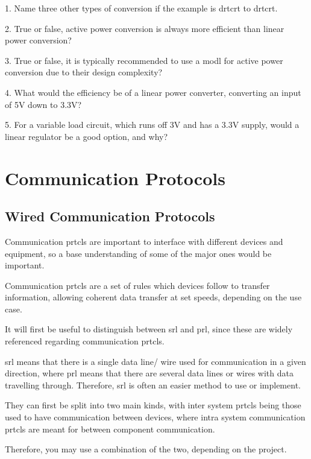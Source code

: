 \documentclass[a4paper,11pt]{report}
\newcommand{\Quiz}[1] %
{
\par\noindent %
\phantomsection %
\todo[inline, color=blue!30]{\textbf{#1}} %
\vspace{1em} %
}
\begin{document}
\Quiz{Quiz}

1. Name three other types of conversion if the example is \gls{drtcrt} to \gls{drtcrt}.

2. True or false, active power conversion is always more efficient than linear power conversion?

3. True or false, it is typically recommended to use a \gls{modl} for active power conversion due to their design complexity?

4. What would the efficiency be of a linear power converter, converting an input of 5V down to 3.3V?

5. For a variable load circuit, which runs off 3V and has a 3.3V supply, would a linear regulator be a good option, and why?

\pagebreak

\section{Communication Protocols}

\vspace*{1\baselineskip}

\subsection{Wired Communication Protocols}

Communication \gls{prtcl}s are important to interface with different devices and equipment, so a base understanding of some of the major ones would be important.

Communication \gls{prtcl}s are a set of rules which devices follow to transfer information, allowing coherent data transfer at set speeds, depending on the use case.

It will first be useful to distinguish between \gls{srl} and \gls{prl}, since these are widely referenced regarding communication \gls{prtcl}s.

\gls{srl} means that there is a single data line/ wire used for communication in a given direction, where \gls{prl} means that there are several data lines or wires with data travelling through. Therefore, \gls{srl} is often an easier method to use or implement.

They can first be split into two main kinds, with inter system \gls{prtcl}s being those used to have communication between devices, where intra system communication \gls{prtcl}s are meant for between component communication.

Therefore, you may use a combination of the two, depending on the project.
\end{document}
